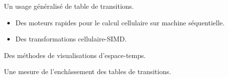 \message{ !name(Slide.tex)}\documentclass[a4paper,dvips]{slides}
\begin{document}
  Un usage g\'en\'eralis\'e de table de transitions.
  \begin{itemize}
  \item[] Des moteurs rapides pour le calcul cellulaire sur machine
    s\'equentielle.
  \item[] Des transformations cellulaire-SIMD.
  \end{itemize}
  Des m\'ethodes de visualisations d'espace-temps.

  Une mesure de l'ench\^assement des tables de transitions.

\end{document}
